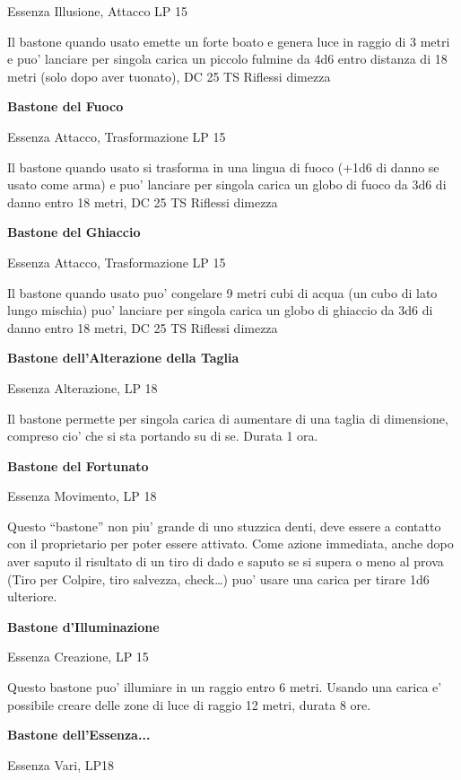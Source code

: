 \documentclass[a4paper,11pt,twoside,openany]{dndbook}
\begin{document}
{Essenza Illusione, Attacco LP 15

Il bastone quando usato emette un forte boato e genera luce in raggio di 3 metri e puo' lanciare per singola carica un piccolo fulmine da 4d6 entro distanza di 18 metri (solo dopo aver tuonato), DC 25 TS Riflessi dimezza

\textbf{Bastone del Fuoco}

Essenza Attacco, Trasformazione LP 15

Il bastone quando usato si trasforma in una lingua di fuoco (+1d6 di danno se usato come arma) e puo' lanciare per singola carica un globo di fuoco da 3d6 di danno entro 18 metri, DC 25 TS Riflessi dimezza

\textbf{Bastone del Ghiaccio}

Essenza Attacco, Trasformazione LP 15

Il bastone quando usato puo' congelare 9 metri cubi di acqua (un cubo di lato lungo mischia) puo' lanciare per singola carica un globo di ghiaccio da 3d6 di danno entro 18 metri, DC 25 TS Riflessi dimezza 

\textbf{Bastone dell'Alterazione della Taglia}

Essenza Alterazione, LP 18

Il bastone permette per singola carica di aumentare di una taglia di dimensione, compreso cio' che si sta portando su di se. Durata 1 ora.

\textbf{Bastone del Fortunato}

Essenza Movimento, LP 18

Questo ``bastone'' non piu' grande di uno stuzzica denti, deve essere a contatto con il proprietario per poter essere attivato. Come azione immediata, anche dopo aver saputo il risultato di un tiro di dado e saputo se si supera o meno al prova (Tiro per Colpire, tiro salvezza, check\ldots ) puo' usare una carica per tirare 1d6 ulteriore.

\textbf{Bastone d'Illuminazione}

Essenza Creazione, LP 15

Questo bastone puo' illumiare in un raggio entro 6 metri. Usando una carica e' possibile creare delle zone di luce di raggio 12 metri, durata 8 ore.

\textbf{Bastone dell'Essenza...}

Essenza Vari, LP18

}
\end{document}
